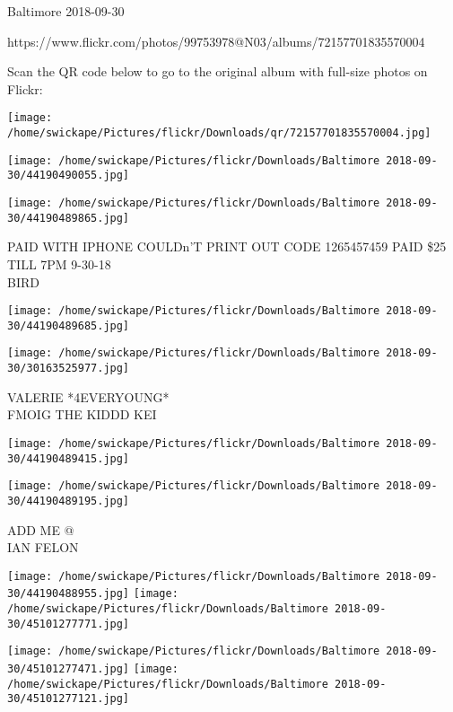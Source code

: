 \documentclass[10pt,letterpaper]{article}
\begin{document}
Baltimore 2018-09-30

https://www.flickr.com/photos/99753978@N03/albums/72157701835570004

Scan the QR code below to go to the original album with full-size photos on Flickr:

\texttt{[image: /home/swickape/Pictures/flickr/Downloads/qr/72157701835570004.jpg]}
\pagebreak

\texttt{[image: /home/swickape/Pictures/flickr/Downloads/Baltimore 2018-09-30/44190490055.jpg]}

\vspace{0.25in}
\texttt{[image: /home/swickape/Pictures/flickr/Downloads/Baltimore 2018-09-30/44190489865.jpg]}

PAID WITH IPHONE COULDn'T PRINT OUT CODE 1265457459 PAID \$25 TILL 7PM 9{-}30{-}18\\
BIRD\\
\pagebreak

\texttt{[image: /home/swickape/Pictures/flickr/Downloads/Baltimore 2018-09-30/44190489685.jpg]}

\vspace{0.25in}
\texttt{[image: /home/swickape/Pictures/flickr/Downloads/Baltimore 2018-09-30/30163525977.jpg]}

VALERIE *4EVERYOUNG*\\
FMOIG THE KIDDD KEI\\
\pagebreak

\texttt{[image: /home/swickape/Pictures/flickr/Downloads/Baltimore 2018-09-30/44190489415.jpg]}

\vspace{0.25in}
\texttt{[image: /home/swickape/Pictures/flickr/Downloads/Baltimore 2018-09-30/44190489195.jpg]}

ADD ME @\\
IAN FELON\\
\pagebreak

\texttt{[image: /home/swickape/Pictures/flickr/Downloads/Baltimore 2018-09-30/44190488955.jpg]}
\texttt{[image: /home/swickape/Pictures/flickr/Downloads/Baltimore 2018-09-30/45101277771.jpg]}

\texttt{[image: /home/swickape/Pictures/flickr/Downloads/Baltimore 2018-09-30/45101277471.jpg]}
\texttt{[image: /home/swickape/Pictures/flickr/Downloads/Baltimore 2018-09-30/45101277121.jpg]}
\end{document}

